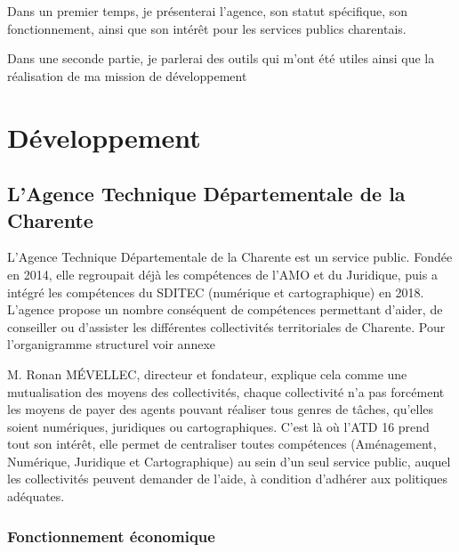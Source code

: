 \documentclass[a4paper,12pt]{report}
\begin{document}
\vspace{1em}

Dans un premier temps, je présenterai l'agence, son statut spécifique, son fonctionnement, ainsi que son intérêt pour les services publics charentais.


Dans une seconde partie, je parlerai des outils qui m'ont été utiles ainsi que la réalisation de ma mission de développement

\chapter{Développement}

\section{L'Agence Technique Départementale de la Charente}
L'Agence Technique Départementale de la Charente est un service public. Fondée en 2014, elle regroupait déjà les compétences de l'AMO et du Juridique, puis  a intégré les compétences du SDITEC (numérique et cartographique) en 2018. L'agence propose un nombre conséquent de compétences permettant d'aider, de conseiller ou d'assister les différentes collectivités territoriales de Charente. Pour l'organigramme structurel voir annexe


M. Ronan MÉVELLEC, directeur et fondateur, explique cela comme une mutualisation des moyens des collectivités, chaque collectivité n'a pas forcément les moyens de payer des agents pouvant réaliser tous genres de tâches, qu'elles soient numériques, juridiques ou cartographiques. C'est là où l'ATD 16 prend tout son intérêt, elle permet de centraliser toutes compétences (Aménagement, Numérique, Juridique et Cartographique) au sein d'un seul service public, auquel les collectivités peuvent demander de l'aide, à condition d'adhérer aux politiques adéquates.

\subsection{Fonctionnement économique}
\end{document}
